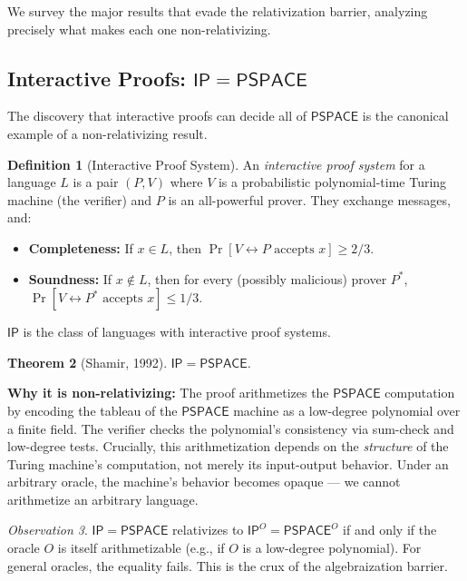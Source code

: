 \documentclass[11pt,a4paper]{article}
\theoremstyle{plain}
\newtheorem{theorem}{Theorem}[section]
\theoremstyle{definition}
\newtheorem{definition}[theorem]{Definition}
\theoremstyle{remark}
\newtheorem{observation}[theorem]{Observation}
\newcommand{\PSPACE}{\mathsf{PSPACE}}
\newcommand{\IP}{\mathsf{IP}}
\begin{document}
We survey the major results that evade the relativization barrier, analyzing
precisely what makes each one non-relativizing.

\subsection{Interactive Proofs: $\IP = \PSPACE$}

The discovery that interactive proofs can decide all of $\PSPACE$
\cite{LFKN92,Shamir92} is the canonical example of a non-relativizing result.

\begin{definition}[Interactive Proof System]
An \emph{interactive proof system} for a language $L$ is a pair $(P, V)$ where
$V$ is a probabilistic polynomial-time Turing machine (the verifier) and $P$ is
an all-powerful prover.  They exchange messages, and:
\begin{itemize}
    \item \textbf{Completeness:} If $x \in L$, then $\Pr[V \leftrightarrow P
    \text{ accepts } x] \geq 2/3$.
    \item \textbf{Soundness:} If $x \notin L$, then for every (possibly malicious)
    prover $P^*$, $\Pr[V \leftrightarrow P^* \text{ accepts } x] \leq 1/3$.
\end{itemize}
$\IP$ is the class of languages with interactive proof systems.
\end{definition}

\begin{theorem}[Shamir, 1992]
$\IP = \PSPACE$.
\end{theorem}

\noindent\textbf{Why it is non-relativizing:} The proof arithmetizes the
$\PSPACE$ computation by encoding the tableau of the $\PSPACE$ machine as a
low-degree polynomial over a finite field.  The verifier checks the polynomial's
consistency via sum-check and low-degree tests.  Crucially, this arithmetization
depends on the \emph{structure} of the Turing machine's computation, not merely
its input-output behavior.  Under an arbitrary oracle, the machine's behavior
becomes opaque — we cannot arithmetize an arbitrary language.

\begin{observation}
$\IP = \PSPACE$ relativizes to $\IP^O = \PSPACE^O$ if and only if the oracle
$O$ is itself arithmetizable (e.g., if $O$ is a low-degree polynomial).  For
general oracles, the equality fails.  This is the crux of the algebraization
barrier.
\end{observation}
\end{document}
